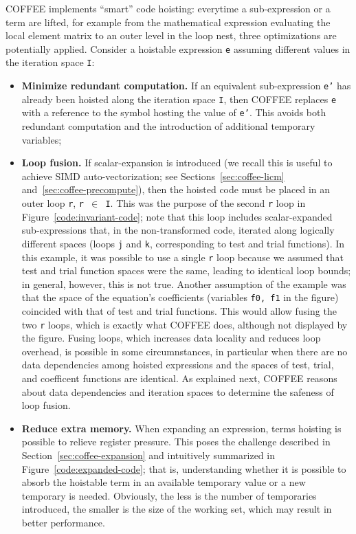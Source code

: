 COFFEE implements ``smart'' code hoisting: everytime a sub-expression or a term are lifted, for example from the mathematical expression evaluating the local element matrix to an outer level in the loop nest, three optimizations are potentially applied. Consider a hoistable expression \texttt{e} assuming different values in the iteration space \texttt{I}:
\begin{itemize}
\item \textbf{Minimize redundant computation.} If an equivalent sub-expression \texttt{e'} has already been hoisted along the iteration space \texttt{I}, then COFFEE replaces \texttt{e} with a reference to the symbol hosting the value of \texttt{e'}. This avoids both redundant computation and the introduction of additional temporary variables;
\item \textbf{Loop fusion.} If scalar-expansion is introduced (we recall this is useful to achieve SIMD auto-vectorization; see Sections~\ref{sec:coffee-licm} and~\ref{sec:coffee-precompute}), then the hoisted code must be placed in an outer loop \texttt{r}, \texttt{r $\in$ I}. This was the purpose of the second \texttt{r} loop in Figure~\ref{code:invariant-code}; note that this loop includes scalar-expanded sub-expressions that, in the non-transformed code, iterated along logically different spaces (loops \texttt{j} and \texttt{k}, corresponding to test and trial functions). In this example, it was possible to use a single \texttt{r} loop because we assumed that test and trial function spaces were the same, leading to identical loop bounds; in general, however, this is not true. Another assumption of the example was that the space of the equation's coefficients (variables \texttt{f0, f1} in the figure) coincided with that of test and trial functions. This would allow fusing the two \texttt{r} loops, which is exactly what COFFEE does, although not displayed by the figure. Fusing loops, which increases data locality and reduces loop overhead, is possible in some circumnstances, in particular when there are no data dependencies among hoisted expressions and the spaces of test, trial, and coefficent functions are identical. As explained next, COFFEE reasons about data dependencies and iteration spaces to determine the safeness of loop fusion.
\item \textbf{Reduce extra memory.} When expanding an expression, terms hoisting is possible to relieve register pressure. This poses the challenge described in Section~\ref{sec:coffee-expansion} and intuitively summarized in Figure~\ref{code:expanded-code}; that is, understanding whether it is possible to absorb the hoistable term in an available temporary value or a new temporary is needed. Obviously, the less is the number of temporaries introduced, the smaller is the size of the working set, which may result in better performance.
\end{itemize}

